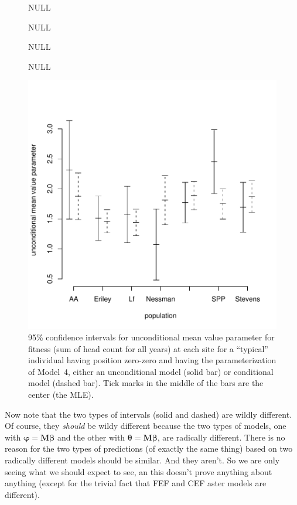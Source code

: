 \documentclass[11pt]{article}
\newcommand{\boldbeta}{{\boldsymbol{\beta}}}
\newcommand{\boldtheta}{{\boldsymbol{\theta}}}
\newcommand{\boldvarphi}{{\boldsymbol{\varphi}}}
\newcommand{\boldM}{{\mathbf{M}}}
\begin{document}
\begin{figure}
\begin{center}
\begin{Schunk}
\begin{Soutput}
NULL
\end{Soutput}
\begin{Soutput}
NULL
\end{Soutput}
\begin{Soutput}
NULL
\end{Soutput}
\begin{Soutput}
NULL
\end{Soutput}
\end{Schunk}
\includegraphics{tutor-fig2}
\end{center}
\caption{95\% confidence intervals for unconditional
mean value parameter for fitness (sum of head count for all years) at each
site for a ``typical'' individual having position zero-zero and having
the parameterization of Model~4, either an unconditional model (solid bar)
or conditional model (dashed bar).
Tick marks in the middle of the bars are the center (the MLE).}
\label{fig:two}
\end{figure}

Now note that the two types of intervals (solid and dashed) are wildly
different.  Of course, they \emph{should} be wildy different because
the two types of models, one with $\boldvarphi = \boldM \boldbeta$
and the other with $\boldtheta = \boldM \boldbeta$,
are radically different.  There is no reason for the two types of predictions
(of exactly the same thing) based on two radically different models should
be similar.  And they aren't.  So we are only seeing what we should expect
to see, an this doesn't prove anything about anything (except for the
trivial fact that FEF and CEF aster models are different).
\end{document}
